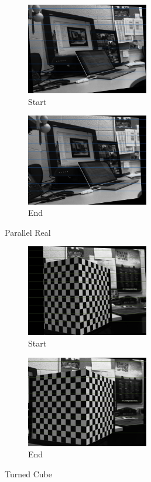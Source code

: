 \documentclass[10pt,a4paper]{article}
\begin{document}
\begin{figure}[h]
\centering
\begin{subfigure}{.5\textwidth}
  \centering
  \includegraphics[height=4cm,keepaspectratio]{paraRealS}
  \caption{Start}
  \label{fig:sub1}
\end{subfigure}%
\begin{subfigure}{.5\textwidth}
  \centering
  \includegraphics[height=4cm,keepaspectratio]{paraRealE}
  \caption{End}
  \label{fig:sub2}
\end{subfigure}
\label{fig:test}
\caption{Parallel Real}
\end{figure}

\begin{figure}[h]
\centering
\begin{subfigure}{.5\textwidth}
  \centering
  \includegraphics[height=4cm,keepaspectratio]{turnCubeS}
  \caption{Start}
  \label{fig:sub1}
\end{subfigure}%
\begin{subfigure}{.5\textwidth}
  \centering
  \includegraphics[height=4cm,keepaspectratio]{turnCubeE}
  \caption{End}
  \label{fig:sub2}
\end{subfigure}
\label{fig:test}
\caption{Turned Cube}
\end{figure}
\end{document}
